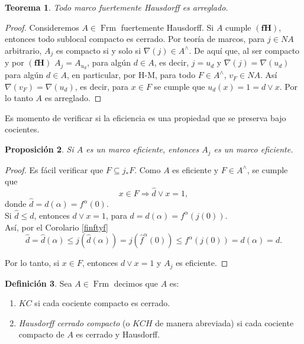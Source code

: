 \documentclass[11pt]{amsart}
\DeclareMathOperator{\Frm}{Frm}
\theoremstyle{plain}
\newtheorem{thm}{Teorema}[section]
\newtheorem{prop}[thm]{Proposición}
\theoremstyle{definition}
\newtheorem{dfn}[thm]{Definición}
\begin{document}

\begin{thm}
    Todo marco fuertemente Hausdorff es arreglado.
\end{thm}

\begin{proof}
    Consideremos $A\in \Frm$ fuertemente Hausdorff. Si $A$ cumple $\mathbf{(fH)}$, entonces todo sublocal compacto es cerrado. Por teoría de marcos, para $j\in NA$ arbitrario, $A_j$ es compacto si y solo si $\nabla(j)\in A^\wedge$. De aquí que, al ser compacto y por $\mathbf{(fH)}$ $A_j=A_{u_d}$, para algún $d\in A$, es decir, $j=u_d$ y $\nabla(j)=\nabla(u_d)$ para algún $d\in A$, en particular, por H-M, para todo $F\in A^\wedge$, $v_F\in NA$. Así $\nabla(v_F)=\nabla(u_d)$, es decir, para $x\in F$ se cumple que $u_d(x)=1=d\vee x$. Por lo tanto $A$ es arreglado.
\end{proof}

Es momento de verificar si la eficiencia es una propiedad que se preserva bajo cocientes.

\begin{prop}\label{tidyquout}
    Si $A$ es un marco eficiente, entonces $A_j$ es un marco eficiente.
\end{prop}

\begin{proof}
Es fácil verificar que $F\subseteq j_*F$. Como $A$ es eficiente y $F\in A^\wedge$, se cumple que 
\[
x\in F\Rightarrow \hat{d}\vee x=1,
\]
donde $\hat{d}=d(\alpha)=f^\alpha(0)$.\\

Si $\hat{d}\leq d$, entonces $d\vee x=1$, para $d=d(\alpha)=f^\alpha(j(0))$.\\

Así, por el Corolario \ref{finftyf}
\[
\hat{d}=\hat{d}(\alpha)\leq j(\hat{d}(\alpha))=j(\hat{f}^\alpha(0))\leq f^\alpha(j(0))=d(\alpha)=d.
\]

Por lo tanto, si $x\in F$, entonces $d\vee x=1$ y $A_j$ es eficiente.
\end{proof}

\begin{dfn}\label{KC y KCH}
Sea $A\in \Frm$ decimos que $A$ es:
\begin{enumerate}
    \item $KC$ si cada cociente compacto es cerrado.

    \item \emph{Hausdorff cerrado compacto} (o $KCH$ de manera abreviada) si cada cociente compacto de $A$ es cerrado y Hausdorff.
\end{enumerate}
\end{dfn}
\end{document}
